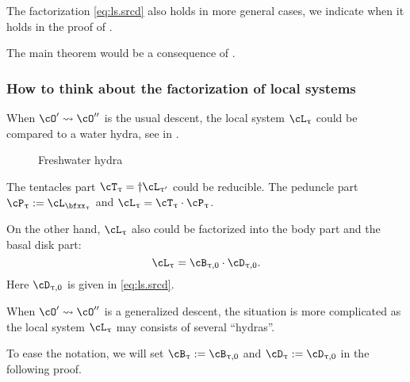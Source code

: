 \documentclass[12pt,a4paper]{amsart}
\newcommand{\bfone}{\mathbf{1}}
\numberwithin{equation}{section}
\theoremstyle{remark}
\def\LLS{\mathrm{{}^{\ell} LS}}
\let\ytb=\ytableaushort
\def\cOp{\cO^{\prime}}
\def\cOpp{\cO^{\prime\prime}}
\def\uptaup{\uptau^{\prime}}
\begin{document}
The factorization \eqref{eq:ls.srcd} also holds in more general cases, we
indicate when it holds in the proof of .

The main theorem would be a consequence of .

\subsubsection{How to think about the factorization of local systems}
When %
$\cOp\leadsto \cOpp$ is the usual descent,
the local system $\cL_{\uptau}$ could be compared to a water hydra, see in
.
\begin{figure}[pb]

  \caption{Freshwater hydra}
  \label{fig:wh}
\end{figure}

The tentacles part $\cT_{\uptau} = \dagger \cL_{\uptaup}$
could be reducible. The peduncle part $\cP_{\uptau} := \cL_{\bfxx_{\uptau}}$ and
$\cL_{\uptau} = \cT_{\uptau}\cdot \cP_{\uptau}$.

On the other hand, $\cL_{\uptau}$ also could be factorized into the body part
and the basal
disk part:
\[
  \cL_{\uptau} = \cB_{\uptau,0}\cdot \cD_{\uptau,0}.
\]
Here $\cD_{\uptau,0}$ is given in \eqref{eq:ls.srcd}.

\medskip

When $\cOp\leadsto \cOpp$ is a generalized descent, the situation is more
complicated as the local system $\cL_{\uptau}$ may consists of several ``hydras''.

To ease the notation, we will set $\cB_{\uptau} :=\cB_{\uptau,0}$  and
$\cD_{\uptau} :=\cD_{\uptau,0}$
in the following proof.



\end{document}
